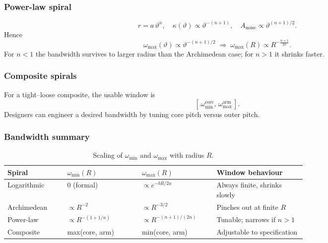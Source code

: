 \subsubsection*{Power-law spiral}

\[
  r = a\,\vartheta^{n},\quad
  \kappa(\vartheta)\propto\vartheta^{-(n+1)},\quad
  A_{\text{noise}}\propto\vartheta^{(n+1)/2}.
\]
Hence
\[
  \omega_{\max}(\vartheta)\propto\vartheta^{-(n+1)/2}
  \;\Longrightarrow\;
  \omega_{\max}(R)\propto R^{-\tfrac{n+1}{2n}}.
\]
For \(n<1\) the bandwidth survives to larger radius than the Archimedean case; for \(n>1\) it shrinks faster.

\subsubsection*{Composite spirals}

For a tight–loose composite, the usable window is
\[
  [\,\omega_{\min}^{\mathrm{core}},\,\omega_{\max}^{\mathrm{arm}}\,].
\]
Designers can engineer a desired bandwidth by tuning core pitch versus outer pitch.

\subsubsection*{Bandwidth summary}

\begin{table}[H]
  \small
  \centering
  \caption{Scaling of \(\omega_{\min}\) and \(\omega_{\max}\) with radius \(R\).}
  \label{tab:bandwidth-summary}
  \renewcommand{\arraystretch}{1.15}
  \begin{tabularx}{\linewidth}{@{}p{0.20\linewidth} p{0.25\linewidth} p{0.25\linewidth} X@{}}
    \toprule
    \textbf{Spiral}      & \(\omega_{\min}(R)\)     & \(\omega_{\max}(R)\)      & \textbf{Window behaviour} \\
    \midrule
    Logarithmic         & \(0\) (formal)           & \(\propto e^{-bR/2a}\)    & Always finite, shrinks slowly \\
    Archimedean         & \(\propto R^{-2}\)       & \(\propto R^{-3/2}\)      & Pinches out at finite \(R\) \\
    Power-law           & \(\propto R^{-(1+1/n)}\) & \(\propto R^{-(n+1)/(2n)}\) & Tunable; narrows if \(n>1\) \\
    Composite           & max(core, arm)           & min(core, arm)            & Adjustable to specification \\
    \bottomrule
  \end{tabularx}
\end{table}

